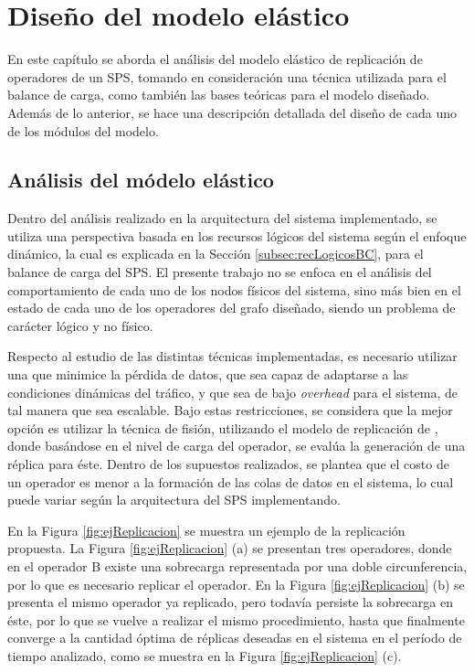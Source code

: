 \chapter{Dise\~no del modelo elástico}
\label{cap:disenoSistema}

En este capítulo se aborda el análisis del modelo elástico de replicación de operadores de un SPS, tomando en consideración una técnica utilizada para el balance de carga, como también las bases teóricas para el modelo diseñado. Además de lo anterior, se hace una descripción detallada del diseño de cada uno de los módulos del modelo.

\section{Análisis del módelo elástico}
Dentro del análisis realizado en la arquitectura del sistema implementado, se utiliza una perspectiva basada en los recursos lógicos del sistema según el enfoque dinámico, la cual es explicada en la Sección \ref{subsec:recLogicosBC}, para el balance de carga del SPS. El presente trabajo no se enfoca en el análisis del comportamiento de cada uno de los nodos físicos del sistema, sino más bien en el estado de cada uno de los operadores del grafo diseñado, siendo un problema de carácter lógico y no físico.

Respecto al estudio de las distintas técnicas implementadas, es necesario utilizar una que minimice la pérdida de datos, que sea capaz de adaptarse a las condiciones dinámicas del tráfico, y que sea de bajo \textit{overhead} para el sistema, de tal manera que sea escalable. Bajo estas restricciones, se considera que la mejor opción es utilizar la técnica de fisión, utilizando el modelo de replicación de \citep{FernandezMKP13}, donde basándose en el nivel de carga del operador, se evalúa la generación de una réplica para éste. \normalsize{Dentro de los supuestos realizados}, se plantea que el costo de un operador es menor a la formación de las colas de datos en el sistema, lo cual puede variar según la arquitectura del SPS implementando.

En la Figura \ref{fig:ejReplicacion} se muestra un ejemplo de la replicación propuesta. La Figura \ref{fig:ejReplicacion} (a) se presentan tres operadores, donde en el operador B existe una sobrecarga representada por una doble circunferencia, por lo que es necesario replicar el operador. En la Figura \ref{fig:ejReplicacion} (b) se presenta el mismo operador ya replicado, pero todavía persiste la sobrecarga en éste, por lo que se vuelve a realizar el mismo procedimiento, hasta que finalmente converge a la cantidad óptima de réplicas deseadas en el sistema en el período de tiempo analizado, como se muestra en la Figura \ref{fig:ejReplicacion} (c).

